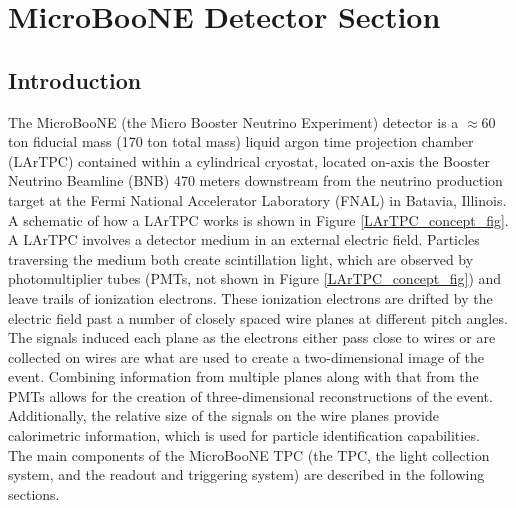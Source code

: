 
\section{MicroBooNE Detector Section}\label{UBDetectorSection}

\subsection{Introduction}
The MicroBooNE (the Micro Booster Neutrino Experiment) detector \cite{UBDetectorPaper} is a $\approx$60 ton fiducial mass (170 ton total mass) liquid argon time projection chamber (LArTPC) contained within a cylindrical cryostat, located on-axis the Booster Neutrino Beamline (BNB) 470 meters downstream from the neutrino production target at the Fermi National Accelerator Laboratory (FNAL) in Batavia, Illinois. A schematic of how a LArTPC works is shown in Figure \ref{LArTPC_concept_fig}. A LArTPC involves a detector medium in an external electric field. Particles traversing the medium both create scintillation light, which are observed by photomultiplier tubes (PMTs, not shown in Figure \ref{LArTPC_concept_fig}) and leave trails of ionization electrons. These ionization electrons are drifted by the electric field past a number of closely spaced wire planes at different pitch angles. The signals induced each plane as the electrons either pass close to wires or are collected on wires are what are used to create a two-dimensional image of the event. Combining information from multiple planes along with that from the PMTs allows for the creation of three-dimensional reconstructions of the event. Additionally, the relative size of the signals on the wire planes provide calorimetric information, which is used for particle identification capabilities.\\

The main components of the MicroBooNE TPC (the TPC, the light collection system, and the readout and triggering system) are described in the following sections.

